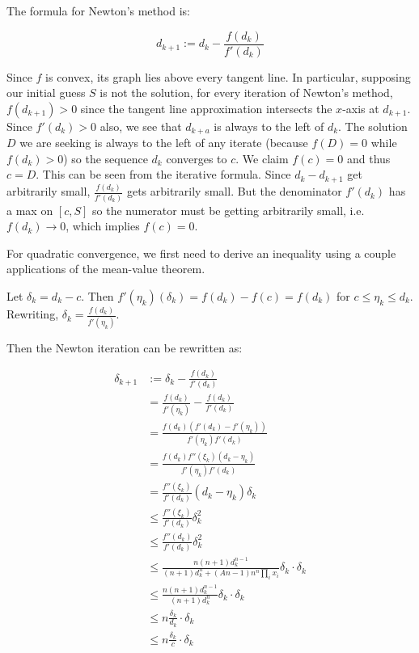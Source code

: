 \documentclass[
]{article}
\begin{document}
The formula for Newton's method is:

\[ d_{k+1} := d_k - \frac{f(d_k)}{f'(d_k)} \]

Since \(f\) is convex, its graph lies above every tangent line. In
particular, supposing our initial guess \(S\) is not the solution, for
every iteration of Newton's method, \(f(d_{k+1}) > 0\) since the tangent
line approximation intersects the \(x\)-axis at \(d_{k+1}\). Since
\(f'(d_k) > 0\) also, we see that \(d_{k+a}\) is always to the left of
\(d_k\). The solution \(D\) we are seeking is always to the left of any
iterate (because \(f(D) = 0\) while \(f(d_k) > 0\)) so the sequence
\(d_k\) converges to \(c\). We claim \(f(c) = 0\) and thus \(c = D\).
This can be seen from the iterative formula. Since \(d_{k} - d_{k+1}\)
get arbitrarily small, \(\frac{f(d_k)}{f'(d_k)}\) gets arbitrarily
small. But the denominator \(f'(d_k)\) has a max on \([c, S]\) so the
numerator must be getting arbitrarily small,
i.e.~\(f(d_k) \rightarrow 0\), which implies \(f(c) = 0\).

For quadratic convergence, we first need to derive an inequality using a
couple applications of the mean-value theorem.

Let \(\delta_k = d_k - c\). Then
\(f'(\eta_k) (\delta_k) = f(d_k) - f(c) = f(d_k)\) for
\(c\leq \eta_k \leq d_k\). Rewriting,
\(\delta_k = \frac{f(d_k)}{f'(\eta_k)}\).

Then the Newton iteration can be rewritten as:

\[\begin{aligned}
\delta_{k+1} &:= \delta_k - \frac{f(d_k)}{f'(d_k)} \\
&= \frac{f(d_k)}{f'(\eta_k)} - \frac{f(d_k)}{f'(d_k)} \\
&= \frac{ f(d_k) (f'(d_k) - f'(\eta_k)) }{f'(\eta_k) f'(d_k)} \\
&= \frac{ f(d_k) f''(\xi_k)(d_k - \eta_k)}{f'(\eta_k) f'(d_k)} \\
&= \frac{f''(\xi_k)}{f'(d_k)} (d_k - \eta_k) \delta_k\\
&\leq \frac{f''(\xi_k)}{f'(d_k)} \delta_k^2\\
&\leq \frac{f''(d_k)}{f'(d_k)} \delta_k^2\\
&\leq \frac{n (n+1) d_k^{n-1} }{(n+1) d_k^n + (An - 1) n^n \prod_i x_i  }\delta_k  \cdot \delta_k\\
&\leq \frac{n (n+1) d_k^{n-1} }{(n+1) d_k^n }\delta_k  \cdot \delta_k\\
&\leq n\frac{\delta_k}{d_k } \cdot \delta_k\\
&\leq n\frac{\delta_k}{c } \cdot \delta_k\\
\end{aligned}\]
\end{document}
